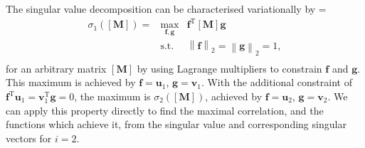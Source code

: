 \documentclass[10pt, a4paper]{article}
\numberwithin{equation}{section} %
\theoremstyle{definition}
\theoremstyle{plain}
\newenvironment{Array}[1] %
{\def\arraystretch{1.75}\everymath={\displaystyle}\begin{equation}\begin{array}{#1}}
{\end{array}\end{equation}}
\newcommand{\norm}[1]{\left\lVert#1\right\rVert}
\newcommand{\?}{\mathrel{?}} %
\newcommand{\cvec}[1]{\boldsymbol{\mathbf{#1}}}    %
\newcommand{\rvec}[1]{\boldsymbol{\mathbf{#1}}^{\mathrm{T}}} %
\newcommand{\matr}[1]{\left[\mathbf{#1}\right]} %
\begin{document}
    The singular value decomposition can be characterised variationally by
    \begin{Array}{rcl}
      \sigma_1(\matr{M}) = & \max_{\cvec{f},\cvec{g}} & \rvec{f} \matr{M} \cvec{g} \\
                            & \text{s.t.} & \norm{\cvec{f}}_2 = \norm{\cvec{g}}_2 = 1, \\
    \end{Array}
    for an arbitrary matrix \(\matr{M}\) by using Lagrange multipliers to constrain \(\cvec{f}\) and \(\cvec{g}\). This maximum is achieved by \(\cvec{f} = \cvec{u}_1\), \(\cvec{g} = \cvec{v}_1\). With the additional constraint of \(\rvec{f} \cvec{u}_1 = \rvec{v}_1 \cvec{g} = 0\), the maximum is \(\sigma_2(\matr{M})\), achieved by \(\cvec{f} = \cvec{u}_2\), \(\cvec{g} = \cvec{v}_2\). We can apply this property directly to find the maximal correlation, and the functions which achieve it, from the singular value and corresponding singular vectors for \(i = 2\).
\end{document}

